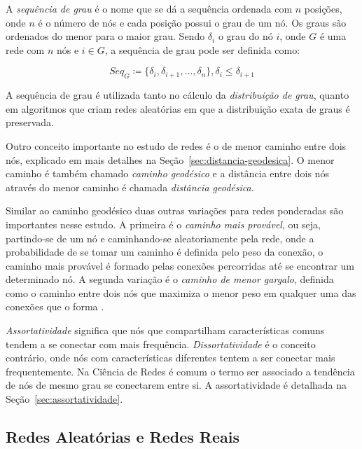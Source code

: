 \documentclass[12pt,a4paper]{article}
\theoremstyle{hypo}
\newcommand{\defn}{\coloneqq} %
\begin{document}
A \textit{sequência de grau} é o nome que se dá a sequência ordenada com $n$ posições, onde $n$ é o número de nós e cada posição possui o grau de um nó. Os graus são ordenados do menor para o maior grau. Sendo $\delta_i$ o grau do nó $i$, onde $G$ é uma rede com $n$ nós e $i \in G$, a sequência de grau pode ser definida como:

\begin{equation} \label{eq:sequencia-grau}
\textit{Seq}_G \defn \{\delta_i, \delta_{i+1}, \ldots, \delta_n\}, \delta_i \le \delta_{i+1}
\end{equation}

A sequência de grau é utilizada tanto no cálculo da \textit{distribuição de grau}, quanto em algoritmos que criam redes aleatórias em que a distribuição exata de graus é preservada.

Outro conceito importante no estudo de redes é o de menor caminho entre dois nós, explicado em mais detalhes na Seção~\ref{sec:distancia-geodesica}. O menor caminho é também chamado \textit{caminho geodésico} e a distância entre dois nós através do menor caminho é chamada \textit{distância geodésica}.


Similar ao caminho geodésico duas outras variações para redes ponderadas são importantes nesse estudo. A primeira é o \textit{caminho mais provável}, ou seja, partindo-se de um nó e caminhando-se aleatoriamente pela rede, onde a probabilidade de se tomar um caminho é definida pelo peso da conexão, o caminho mais provável é formado pelas conexões percorridas até se encontrar um determinado nó. A segunda variação é o \textit{caminho de menor gargalo}, definida como o caminho entre dois nós que maximiza o menor peso em qualquer uma das conexões que o forma \cite{Goldbarg2012-uc}.


\textit{Assortatividade} significa que nós que compartilham características comuns tendem a se conectar com mais frequência. \textit{Dissortatividade} é o conceito contrário, onde nós com características diferentes tentem a ser conectar mais frequentemente. Na Ciência de Redes é comum o termo ser associado a tendência de nós de mesmo grau se conectarem entre si. A assortatividade é detalhada na Seção~\ref{sec:assortatividade}.

\subsection{Redes Aleatórias e Redes Reais} \label{sec:redes-aleatorias}
\end{document}
